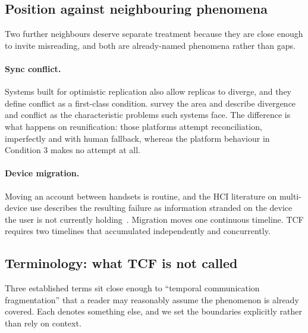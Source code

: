 \subsection{Position against neighbouring phenomena}
\label{sec:tcf:neighbours}



Two further neighbours deserve separate treatment because they are close enough
to invite misreading, and both are already-named phenomena rather than gaps.

\paragraph{Sync conflict.}
Systems built for optimistic replication also allow replicas to diverge, and they
define conflict as a first-class condition. \citet{saito2005optimistic} survey
the area and describe divergence and conflict as the characteristic problems such
systems face. The difference is what happens on reunification: those platforms
attempt reconciliation, imperfectly and with human fallback, whereas the platform
behaviour in Condition 3 makes no attempt at all.

\paragraph{Device migration.}
Moving an account between handsets is routine, and the HCI literature on
multi-device use describes the resulting failure as information stranded on the
device the user is not currently holding~\citep{dearman2008othercomputer}.
Migration moves one continuous timeline. TCF requires two timelines that
accumulated independently and concurrently.

\subsection{Terminology: what TCF is not called}
\label{sec:tcf:terminology}

Three established terms sit close enough to ``temporal communication
fragmentation'' that a reader may reasonably assume the phenomenon is already
covered. Each denotes something else, and we set the boundaries explicitly rather
than rely on context.

